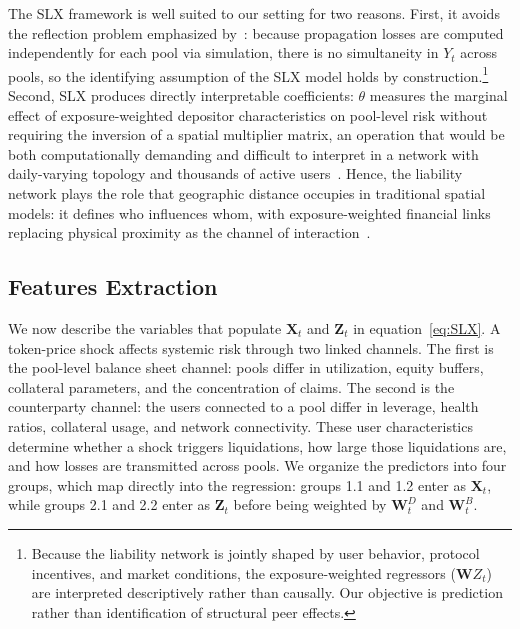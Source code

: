 \documentclass[a4paper,UKenglish,cleveref, autoref, thm-restate]{informs3}
\begin{document}
The SLX framework is well suited to our setting for two 
reasons. First, it avoids the reflection problem emphasized 
by~\cite{Manski}: because propagation losses are computed 
independently for each pool via simulation, there is no 
simultaneity in $Y_t$ across pools, so the identifying 
assumption of the SLX model holds by 
construction.\footnote{Because the liability network is jointly shaped by user behavior, protocol incentives, and market conditions, the exposure-weighted regressors ($\mathbf{W}Z_t$) are interpreted descriptively rather than causally. Our objective is prediction rather than identification of structural peer effects.} Second, SLX 
produces directly interpretable coefficients: $\theta$ 
measures the marginal effect of exposure-weighted depositor 
characteristics on pool-level risk without requiring the 
inversion of a spatial multiplier matrix, an operation that 
would be both computationally demanding and difficult to 
interpret in a network with daily-varying topology and 
thousands of active users~\citep{Elhorst2014}. Hence, the liability network plays the role that geographic 
distance occupies in traditional spatial models: it defines 
who influences whom, with exposure-weighted financial links 
replacing physical proximity as the channel of 
interaction~\citep{BenAbdallah2022,paelinck1979spatial}.

\subsection{Features Extraction}\label{sec:features}

We now describe the variables that populate $\mathbf{X}_t$ and $\mathbf{Z}_t$ in equation~\eqref{eq:SLX}. A token-price shock affects systemic risk through two linked channels. The first is the pool-level balance sheet channel: pools differ in utilization, equity buffers, collateral parameters, and the concentration of claims. The second is the counterparty channel: the users connected to a pool differ in leverage, health ratios, collateral usage, and network connectivity. These user characteristics determine whether a shock triggers liquidations, how large those liquidations are, and how losses are transmitted across pools. We organize the predictors into four groups, which map directly into the regression: groups 1.1 and 1.2 enter as $\mathbf{X}_t$, while groups 2.1 and 2.2 enter as $\mathbf{Z}_t$ before being weighted by $\mathbf{W}^D_t$ and $\mathbf{W}^B_t$.
\end{document}
